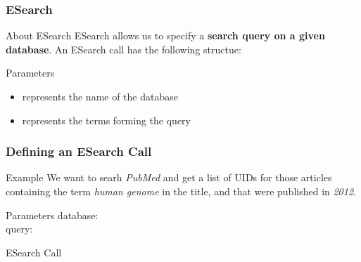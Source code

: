 \documentclass{beamer}\usepackage[]{graphicx}\usepackage[]{color}
\begin{document}
\begin{frame}
\frametitle{ESearch}

\begin{block}{About ESearch}
ESearch allows us to specify a \textbf{search query on a given database}. An ESearch call has the following structue: \\
\end{block}

\begin{block}{Parameters}
\begin{itemize}
 \item {} represents the name of the database
 \item {} represents the terms forming the query
\end{itemize}
\end{block}

\end{frame}


\begin{frame}
\frametitle{Defining an ESearch Call}

\begin{block}{Example}
We want to searh \textit{PubMed} and get a list of UIDs for those articles containing the term \textit{human genome} in the title, and that were published in \textit{2012}. 
\end{block}

\begin{block}{Parameters}
database:  \\

query: 
\end{block}

\begin{block}{ESearch Call}
{\footnotesize
{}
}
\end{block}

\end{frame}

\end{document}
